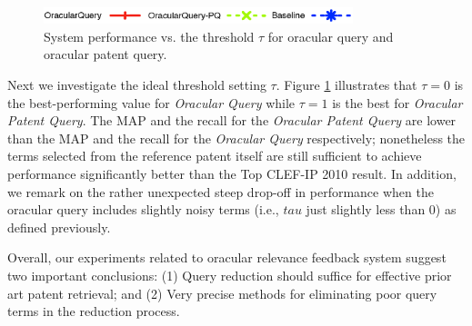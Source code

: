 \begin{figure}[t!]
\begin{centering}
\includegraphics[width=9cm]{imgs/legend}
\par\end{centering}

\begin{centering}
\par\end{centering}

\protect\caption{System performance vs. the threshold $\tau$ for oracular query and oracular patent query.}
\label{fig:oracular}
\end{figure}

Next we investigate the ideal threshold setting $\tau$.
Figure \ref{fig:oracular} illustrates that $\tau=0$ is the
best-performing value for {\em Oracular Query} while $\tau=1$ is the
best for {\em Oracular Patent Query}.  The MAP and the recall for the {\em Oracular
Patent Query} are lower than the MAP and the recall for the {\em Oracular Query} respectively;
nonetheless the terms selected from the reference patent itself are
still sufficient to achieve performance significantly better than the
Top CLEF-IP 2010 result.  In addition, we remark on the rather
unexpected steep drop-off in performance when the oracular query
includes slightly noisy terms (i.e., $tau$ just slightly less than 0)
as defined previously.

Overall, our experiments related to oracular relevance feedback system
suggest two important conclusions: (1) Query reduction should suffice for effective prior art patent retrieval; and (2) Very precise methods for eliminating poor query terms in the reduction process.


